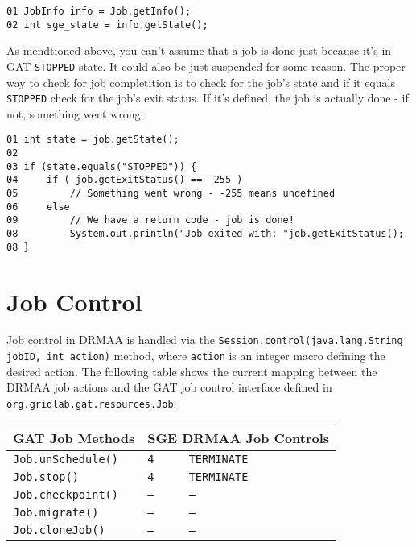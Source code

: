 \documentclass[bibtotocnumbered, headsepline,normalheadings]{scrreprt}
\begin{document}
\begin{verbatim}
01 JobInfo info = Job.getInfo();
02 int sge_state = info.getState();
\end{verbatim}

As mendtioned above, you can't assume that a job is done just because it's in GAT \texttt{STOPPED} state. It could also be just suspended for some reason.
The proper way to check for job completition is to check for the job's state and if it equals \texttt{STOPPED} check for the job's exit status. If it's defined, the job is actually done - if not, something went wrong:

\begin{verbatim}
01 int state = job.getState();
02
03 if (state.equals("STOPPED")) {
04     if ( job.getExitStatus() == -255 ) 
05         // Something went wrong - -255 means undefined
06     else
09         // We have a return code - job is done!
08         System.out.println("Job exited with: "job.getExitStatus();
08 }
\end{verbatim}

\section{Job Control}
Job control in DRMAA is handled via the \texttt{Session.control(java.lang.String jobID, int action)} method, where \texttt{action} is an integer macro defining the desired action. The following table shows the current mapping between the DRMAA job actions and the GAT job control interface defined in \texttt{org.gridlab.gat.resources.Job}:

\begin{center}
\begin{tabular}{|l|l|l|} \hline
	\multicolumn{1}{|c|}{GAT Job Methods}&
	\multicolumn{2}{|c|}{SGE DRMAA Job Controls}\\ \hline\hline
	 \texttt{Job.unSchedule()}   			& \texttt{4}  & \texttt{TERMINATE}\\ \hline
	 \texttt{Job.stop()} 					& \texttt{4}  & \texttt{TERMINATE}\\ \hline
	 \texttt{Job.checkpoint()}   			& \texttt{--} & \texttt{--}\\ \hline
	 \texttt{Job.migrate()}   				& \texttt{--} & \texttt{--}\\ \hline
	 \texttt{Job.cloneJob()} 				& \texttt{--} & \texttt{--}\\ \hline
\end{tabular}
\end{center}
\end{document}
